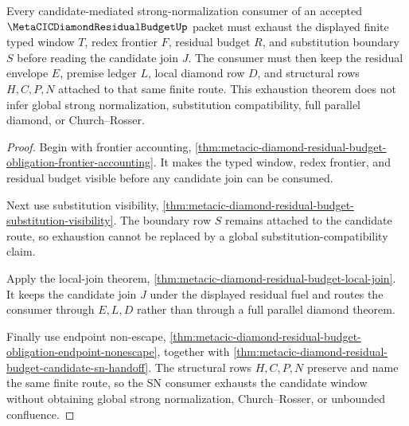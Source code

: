 \begin{theorem}
\label{thm:metacic-diamond-residual-budget-candidate-window-exhaustion}
Every candidate-mediated strong-normalization consumer of an accepted $\MetaCICDiamondResidualBudgetUp$ packet must exhaust the displayed finite typed window $T$, redex frontier $F$, residual budget $R$, and substitution boundary $S$ before reading the candidate join $J$. The consumer must then keep the residual envelope $E$, premise ledger $L$, local diamond row $D$, and structural rows $H,C,P,N$ attached to that same finite route. This exhaustion theorem does not infer global strong normalization, substitution compatibility, full parallel diamond, or Church--Rosser.
\end{theorem}
\begin{proof}
Begin with frontier accounting, \autoref{thm:metacic-diamond-residual-budget-obligation-frontier-accounting}. It makes the typed window, redex frontier, and residual budget visible before any candidate join can be consumed.

Next use substitution visibility, \autoref{thm:metacic-diamond-residual-budget-substitution-visibility}. The boundary row $S$ remains attached to the candidate route, so exhaustion cannot be replaced by a global substitution-compatibility claim.

Apply the local-join theorem, \autoref{thm:metacic-diamond-residual-budget-local-join}. It keeps the candidate join $J$ under the displayed residual fuel and routes the consumer through $E,L,D$ rather than through a full parallel diamond theorem.

Finally use endpoint non-escape, \autoref{thm:metacic-diamond-residual-budget-obligation-endpoint-nonescape}, together with \autoref{thm:metacic-diamond-residual-budget-candidate-sn-handoff}. The structural rows $H,C,P,N$ preserve and name the same finite route, so the SN consumer exhausts the candidate window without obtaining global strong normalization, Church--Rosser, or unbounded confluence.
\end{proof}

